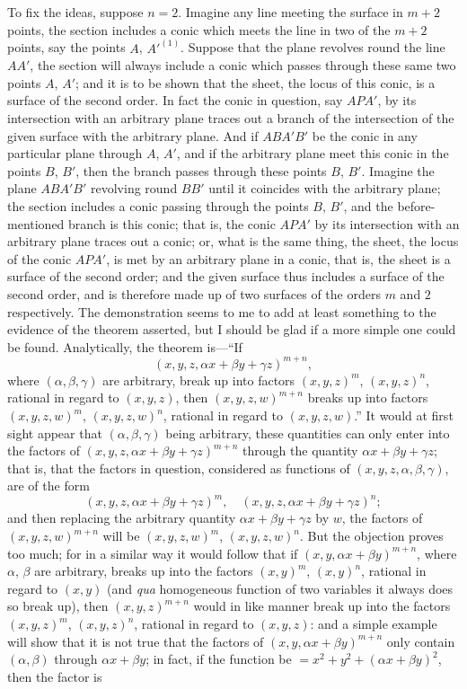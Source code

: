 \documentclass[11pt,a4paper]{article}
\theoremstyle{plain}
\begin{document}
To fix the ideas, suppose $n = 2$. Imagine any line meeting the surface in $m+2$ points, the section includes a conic which meets the line in two of the $m+2$ points, say the points $A$, $A'^{(1)}$. Suppose that the plane revolves round the line $AA'$, the section will always include a conic which passes through these same two points $A$, $A'$; and it is to be shown that the sheet, the locus of this conic, is a surface of the second order. In fact the conic in question, say $APA'$, by its intersection with an arbitrary plane traces out a branch of the intersection of the given surface with the arbitrary plane. And if $ABA'B'$ be the conic in any particular plane through $A$, $A'$, and if the arbitrary plane meet this conic in the points $B$, $B'$, then the branch passes through these points $B$, $B'$. Imagine the plane $ABA'B'$ revolving round $BB'$ until it coincides with the arbitrary plane; the section includes a conic passing through the points $B$, $B'$, and the before-mentioned branch is this conic; that is, the conic $APA'$ by its intersection with an arbitrary plane traces out a conic; or, what is the same thing, the sheet, the locus of the conic $APA'$, is met by an arbitrary plane in a conic, that is, the sheet is a surface of the second order; and the given surface thus includes a surface of the second order, and is therefore made up of two surfaces of the orders $m$ and $2$ respectively. The demonstration seems to me to add at least something to the evidence of the theorem asserted, but I should be glad if a more simple one could be found. Analytically, the theorem is---``If
\[
(x, y, z, \alpha x + \beta y + \gamma z)^{m+n},
\]
where $(\alpha, \beta, \gamma)$ are arbitrary, break up into factors $(x, y, z)^m$, $(x, y, z)^n$, rational in regard to $(x, y, z)$, then $(x, y, z, w)^{m+n}$ breaks up into factors $(x, y, z, w)^m$, $(x, y, z, w)^n$, rational in regard to $(x, y, z, w)$.'' It would at first sight appear that $(\alpha, \beta, \gamma)$ being arbitrary, these quantities can only enter into the factors of $(x, y, z, \alpha x + \beta y + \gamma z)^{m+n}$ through the quantity $\alpha x + \beta y + \gamma z$; that is, that the factors in question, considered as functions of $(x, y, z, \alpha, \beta, \gamma)$, are of the form
\[
(x, y, z, \alpha x + \beta y + \gamma z)^m, \quad (x, y, z, \alpha x + \beta y + \gamma z)^n;
\]
and then replacing the arbitrary quantity $\alpha x + \beta y + \gamma z$ by $w$, the factors of $(x, y, z, w)^{m+n}$ will be $(x, y, z, w)^m$, $(x, y, z, w)^n$. But the objection proves too much; for in a similar way it would follow that if $(x, y, \alpha x + \beta y)^{m+n}$, where $\alpha$, $\beta$ are arbitrary, breaks up into the factors $(x, y)^m$, $(x, y)^n$, rational in regard to $(x, y)$ (and \textit{qua} homogeneous function of two variables it always does so break up), then $(x, y, z)^{m+n}$ would in like manner break up into the factors $(x, y, z)^m$, $(x, y, z)^n$, rational in regard to $(x, y, z)$: and a simple example will show that it is not true that the factors of $(x, y, \alpha x + \beta y)^{m+n}$ only contain $(\alpha, \beta)$ through $\alpha x + \beta y$; in fact, if the function be $= x^2 + y^2 + (\alpha x + \beta y)^2$, then the factor is
\end{document}
